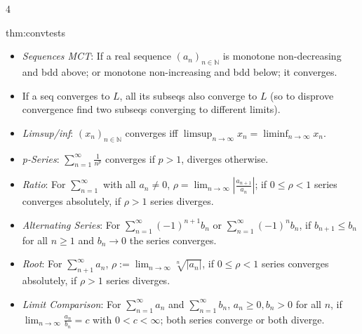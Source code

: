 \documentclass[landscape, 8pt]{extarticle}
\begin{document}
\begin{multicols*}{4}
		
		\begin{thm}{thm:convtests}{ }
		\begin{itemize}
			\item \textit{Sequences MCT}: If a real sequence $(a_n)_{n \in \mathbb{N}}$ is monotone non-decreasing and bdd above; or monotone non-increasing and bdd below; it converges.
			\item If a seq converges to $L$, all its subseqs also converge to $L$ (so to disprove convergence find two subseqs converging to different limits).
			\item \textit{Limsup/inf}: $(x_n)_{n\in \mathbb{N}}$ converges iff $\limsup_{n\to \infty}x_n = \liminf_{n \to \infty}x_n$.
			\item \textit{p-Series}: $\sum_{n=1}^{\infty}\frac{1}{n^p}$ converges if $p >1$, diverges otherwise.
			\item \textit{Ratio}: For $\sum_{n=1}^{\infty}$ with all $a_n \ne 0$, $\rho = \lim_{n\to \infty}\left|\frac{a_{n+1}}{a_n}\right|$; if $0 \le \rho < 1$ series converges absolutely, if $\rho > 1$ series diverges.
			\item \textit{Alternating Series}: For $\sum_{n=1}^{\infty} (-1)^{n+1} b_n$ or $\sum_{n=1}^{\infty}(-1)^n b_n$, if $b_{n +1} \le b_n$ for all $n\ge 1$ and $b_n \to 0$ the series converges.
			\item \textit{Root}: For $\sum_{n+1}^{\infty}a_n$, $\rho := \lim_{n\to \infty} \sqrt[n]{\left|a_n\right|}$, if $0 \le \rho < 1$ series converges absolutely, if $\rho > 1$ series diverges.
			\item \textit{Limit Comparison}: For $\sum_{n=1}^{\infty} a_n$ and $\sum_{n=1}^{\infty}b_n$, $a_n \ge 0, b_n > 0$ for all $n$, if $\lim_{n\to \infty} \frac{a_n}{b_n} = c$ with $0 < c < \infty$; both series converge or both diverge.
		\end{itemize}
		
		
		\end{thm}
		
		
	\end{multicols*}
	
	
\end{document}
